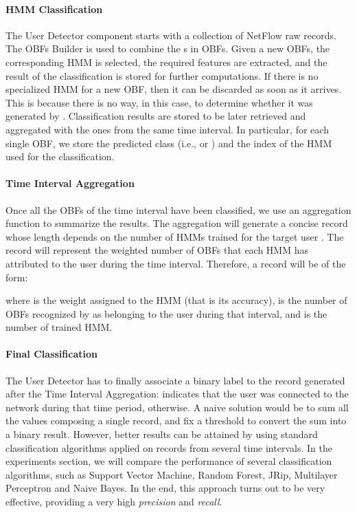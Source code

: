\documentclass[10pt,conference,compsocconf,letterpaper]{IEEEtran}
\begin{document}
\paragraph{HMM Classification}
The User Detector component starts with a collection of NetFlow raw
records. The OBFs Builder is used to combine the \nfr s in OBFs.
Given a new OBFs, the
corresponding HMM is selected, the required features are extracted, and
the result of the classification is stored for further computations.
If there is no specialized HMM for a new OBF, then it  can be discarded as
soon as it arrives. This is because there is no way, in this case,  to determine whether it was 
generated by .
Classification results are stored to be later  retrieved and aggregated with
the ones from the same time interval. In particular, for each single OBF,
we store the predicted class (i.e.,  or ) and the index of the HMM used 
for the classification.

\paragraph{Time Interval Aggregation}
Once all the OBFs of the time interval have been classified, we use an
aggregation function to summarize the results. The aggregation
will generate a concise record whose length depends on the
number of HMMs trained for the target user . The record will represent the weighted number of OBFs that each HMM has
attributed to the user  during the time interval. 
Therefore, a record will be of the form:

where  is the weight assigned to the
 HMM (that is its accuracy),  is the number of OBFs recognized
by  as belonging to the user  during that interval,
and  is the number of trained HMM.

\paragraph{Final Classification}
The User Detector has to finally associate a binary label to the
record generated after the Time Interval Aggregation:  indicates
that the user was connected to the network during that time period,
 otherwise. A naive solution would be to sum all the values composing a
single record, and fix a threshold to convert the sum into a binary
result. However, better results can be attained by using standard
classification algorithms applied on records from several time
intervals.  In the experiments section, we will compare the
performance of several classification algorithms, such as Support Vector
Machine, Random Forest, JRip, Multilayer Perceptron and Naive Bayes. In the end,
this approach turns out to be very effective,  providing a very high \textit{precision} and \textit{recall}.
\end{document}
